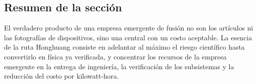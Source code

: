 \subsection{Resumen de la sección}

El verdadero producto de una empresa emergente de fusión no son los artículos ni las fotografías de dispositivos, sino una central con un costo aceptable. La esencia de la ruta Honghuang consiste en adelantar al máximo el riesgo científico hasta convertirlo en física ya verificada, y concentrar los recursos de la empresa emergente en la entrega de ingeniería, la verificación de los subsistemas y la reducción del costo por kilowatt-hora.
